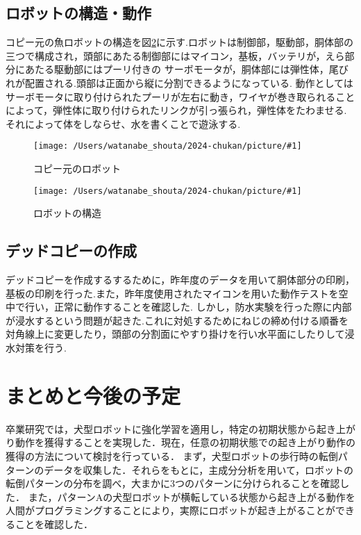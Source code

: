 \documentclass{jarticle}
\newcommand{\setPicture}[1]{\texttt{[image: /Users/watanabe\_shouta/2024-chukan/picture/\#1]}}
\begin{document}
\subsection{ロボットの構造・動作}
コピー元の魚ロボットの構造を図\ref{fig:structure}に示す.ロボットは制御部，駆動部，胴体部の三つで構成され，頭部にあたる制御部にはマイコン，基板，バッテリが，えら部分にあたる駆動部にはプーリ付きの
サーボモータが，胴体部には弾性体，尾びれが配置される.頭部は正面から縦に分割できるようになっている.
動作としてはサーボモータに取り付けられたプーリが左右に動き，ワイヤが巻き取られることによって，弾性体に取り付けられたリンクが引っ張られ，弾性体をたわませる.それによって体をしならせ、水を書くことで遊泳する.


\begin{figure}[t]
   \centering
   \setPicture{fish.jpg}
   \vspace*{-4mm}
   \caption{コピー元のロボット}
   \label{fig:fish-type}
\end{figure}

\begin{figure}[t]
   \centering
   \setPicture{tentativeschematic.png}
   \vspace*{-4mm}
   \caption{ロボットの構造}
   \label{fig:structure}
\end{figure}

\subsection{デッドコピーの作成}
デッドコピーを作成するするために，昨年度のデータを用いて胴体部分の印刷，基板の印刷を行った.また，昨年度使用されたマイコンを用いた動作テストを空中で行い，正常に動作することを確認した.
しかし，防水実験を行った際に内部が浸水するという問題が起きた.これに対処するためにねじの締め付ける順番を対角線上に変更したり，頭部の分割面にやすり掛けを行い水平面にしたりして浸水対策を行う.

\vspace*{-2mm}
\section{まとめと今後の予定}

卒業研究では，犬型ロボットに強化学習を適用し，特定の初期状態から起き上がり動作を獲得することを実現した．現在，任意の初期状態での起き上がり動作の獲得の方法について検討を行っている．
まず，犬型ロボットの歩行時の転倒パターンのデータを収集した．それらをもとに，主成分分析を用いて，ロボットの転倒パターンの分布を調べ，大まかに3つのパターンに分けられることを確認した．
また，パターンAの犬型ロボットが横転している状態から起き上がる動作を人間がプログラミングすることにより，実際にロボットが起き上がることができることを確認した．
\end{document}
